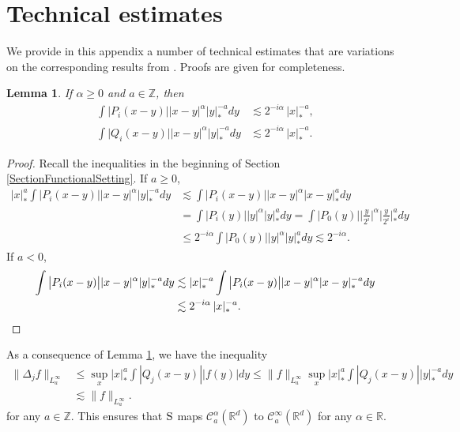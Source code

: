 \documentclass[10pt]{amsart}
\theoremstyle{plain}
\newtheorem{lem}[thm]{Lemma}
\theoremstyle{definition}
\newcommand{\bbR}{\mathbb{R}}
\newcommand{\bbZ}{\mathbb{Z}}
\newcommand{\mcC}{\mathcal{C}}
\begin{document}
\section{Technical estimates}
\label{SectionAppendix}

We provide in this appendix a number of technical estimates that are variations on the corresponding results from \cite{BH}. Proofs are given for completeness.

\begin{lem}\label{lem:weighted scaling}
If $\alpha\ge0$ and $a\in\bbZ$, then
\begin{align*}
\int \big|P_i(x-y)\big| |x-y|^\alpha|y|_*^{-a}dy&\lesssim2^{-i\alpha}\,|x|_*^{-a}, \\
\int \big|Q_i(x-y)\big| |x-y|^\alpha|y|_*^{-a}dy&\lesssim2^{-i\alpha}\,|x|_*^{-a}.
\end{align*}
\end{lem}

\begin{proof}
Recall the inequalities in the beginning of Section \ref{SectionFunctionalSetting}. If $a\ge0$,
\begin{align*}
|x|_*^a\int \big|P_i(x-y)\big| |x-y|^\alpha|y|_*^{-a}dy &\lesssim\int \big|P_i(x-y)\big| |x-y|^\alpha|x-y|_*^a dy\\
&= \int \big|P_i(y)\big| |y|^\alpha|y|_*^a dy = \int \big|P_0(y)\big| \Big|\frac{y}{2^i}\Big|^\alpha\Big|\frac{y}{2^i}\Big|_*^ady\\
&\le 2^{-i\alpha}\int \big|P_0(y)\big| |y|^\alpha |y|_*^ady\lesssim2^{-i\alpha}.
\end{align*}
If $a<0$,
\begin{align*}
\int \big|P_i(x-y)\big| |x-y|^\alpha |y|_*^{-a}dy &\lesssim|x|_*^{-a}\int \big|P_i(x-y)\big| |x-y|^\alpha|x-y|_*^{-a}dy\\
&\lesssim 2^{-i\alpha}\,|x|_*^{-a}.\qedhere
\end{align*}
\end{proof}

As a consequence of Lemma \ref{lem:weighted scaling}, we have the inequality
\begin{align*}
\|\Delta_jf\|_{L_a^\infty}
&\le\sup_x |x|_*^a\int|Q_j(x-y)||f(y)|dy
\le\|f\|_{L_a^\infty}\sup_x |x|_*^a\int|Q_j(x-y)||y|_*^{-a}dy\\
&\lesssim\|f\|_{L_a^\infty}.
\end{align*}
for any $a\in\bbZ$. This ensures that $\textsc{S}$ maps $\mcC_a^\alpha(\bbR^d)$ to $\mcC_a^\infty(\bbR^d)$ for any $\alpha\in\bbR$.
\end{document}
